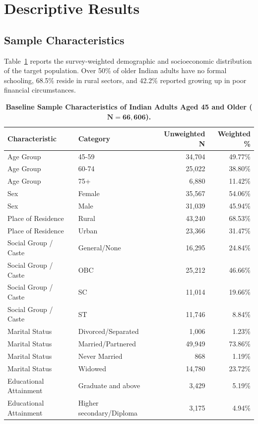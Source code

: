 \documentclass[11pt,a4paper]{article}
\begin{document}
\section{Descriptive Results}

\subsection{Sample Characteristics}
Table~\ref{tab:sample_char} reports the survey-weighted demographic and socioeconomic distribution of the target population. Over 50\% of older Indian adults have no formal schooling, 68.5\% reside in rural sectors, and 42.2\% reported growing up in poor financial circumstances.

\begin{table}[H]
\centering
\small
\caption{\textbf{Baseline Sample Characteristics of Indian Adults Aged 45 and Older ($\mathbf{N=66,606}$).}}
\label{tab:sample_char}
\begin{tabular}{llrr}
\toprule
\textbf{Characteristic} & \textbf{Category} & \textbf{Unweighted N} & \textbf{Weighted \%} \\
\midrule
Age Group & 45-59 & 34,704 & 49.77\% \\
Age Group & 60-74 & 25,022 & 38.80\% \\
Age Group & 75+ & 6,880 & 11.42\% \\
Sex & Female & 35,567 & 54.06\% \\
Sex & Male & 31,039 & 45.94\% \\
Place of Residence & Rural & 43,240 & 68.53\% \\
Place of Residence & Urban & 23,366 & 31.47\% \\
Social Group / Caste & General/None & 16,295 & 24.84\% \\
Social Group / Caste & OBC & 25,212 & 46.66\% \\
Social Group / Caste & SC & 11,014 & 19.66\% \\
Social Group / Caste & ST & 11,746 & 8.84\% \\
Marital Status & Divorced/Separated & 1,006 & 1.23\% \\
Marital Status & Married/Partnered & 49,949 & 73.86\% \\
Marital Status & Never Married & 868 & 1.19\% \\
Marital Status & Widowed & 14,780 & 23.72\% \\
Educational Attainment & Graduate and above & 3,429 & 5.19\% \\
Educational Attainment & Higher secondary/Diploma & 3,175 & 4.94\% \\

\end{tabular}
\end{table}
\end{document}
